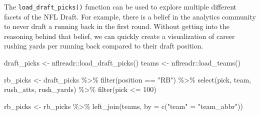 \documentclass[
  letterpaper,
]{krantz}
\newenvironment{Shaded}{\begin{snugshade}}{\end{snugshade}}
\newcommand{\AttributeTok}[1]{\textcolor[rgb]{0.40,0.45,0.13}{#1}}
\newcommand{\DecValTok}[1]{\textcolor[rgb]{0.68,0.00,0.00}{#1}}
\newcommand{\FunctionTok}[1]{\textcolor[rgb]{0.28,0.35,0.67}{#1}}
\newcommand{\NormalTok}[1]{\textcolor[rgb]{0.00,0.23,0.31}{#1}}
\newcommand{\OtherTok}[1]{\textcolor[rgb]{0.00,0.23,0.31}{#1}}
\newcommand{\SpecialCharTok}[1]{\textcolor[rgb]{0.37,0.37,0.37}{#1}}
\newcommand{\StringTok}[1]{\textcolor[rgb]{0.13,0.47,0.30}{#1}}
\begin{document}
The \texttt{load\_draft\_picks()} function can be used to explore
multiple different facets of the NFL Draft. For example, there is a
belief in the analytics community to never draft a running back in the
first round. Without getting into the reasoning behind that belief, we
can quickly create a visualization of career rushing yards per running
back compared to their draft position.

\begin{Shaded}
\begin{Highlighting}[]
\NormalTok{draft\_picks }\OtherTok{\textless{}{-}}\NormalTok{ nflreadr}\SpecialCharTok{::}\FunctionTok{load\_draft\_picks}\NormalTok{()}
\NormalTok{teams }\OtherTok{\textless{}{-}}\NormalTok{ nflreadr}\SpecialCharTok{::}\FunctionTok{load\_teams}\NormalTok{()}

\NormalTok{rb\_picks }\OtherTok{\textless{}{-}}\NormalTok{ draft\_picks }\SpecialCharTok{\%\textgreater{}\%}
  \FunctionTok{filter}\NormalTok{(position }\SpecialCharTok{==} \StringTok{"RB"}\NormalTok{) }\SpecialCharTok{\%\textgreater{}\%}
  \FunctionTok{select}\NormalTok{(pick, team, rush\_atts, rush\_yards) }\SpecialCharTok{\%\textgreater{}\%}
  \FunctionTok{filter}\NormalTok{(pick }\SpecialCharTok{\textless{}=} \DecValTok{100}\NormalTok{)}

\NormalTok{rb\_picks }\OtherTok{\textless{}{-}}\NormalTok{ rb\_picks }\SpecialCharTok{\%\textgreater{}\%}
  \FunctionTok{left\_join}\NormalTok{(teams, }\AttributeTok{by =} \FunctionTok{c}\NormalTok{(}\StringTok{"team"} \OtherTok{=} \StringTok{"team\_abbr"}\NormalTok{))}
\end{Highlighting}
\end{Shaded}
\end{document}
